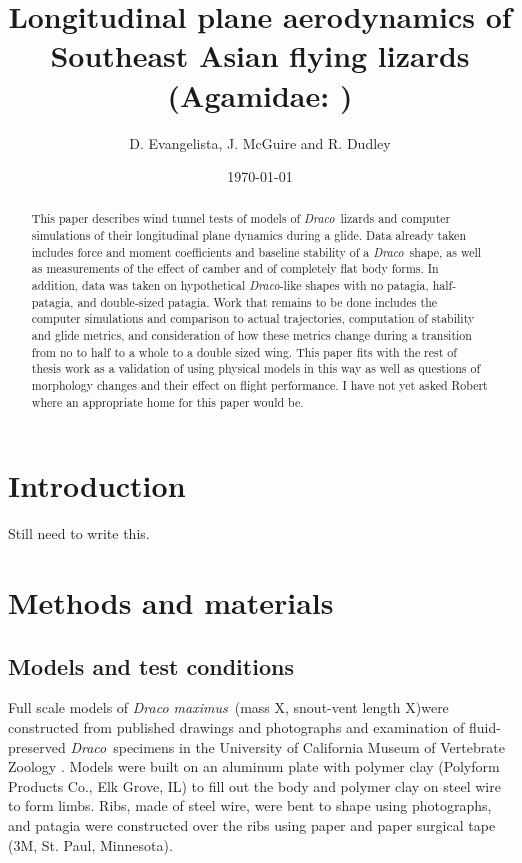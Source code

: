 \documentclass[10pt]{article}
\title{Longitudinal plane aerodynamics of Southeast Asian flying lizards (Agamidae: \Draco)}
\author{D. Evangelista, J. McGuire and R. Dudley}
\date{\today}
\newcommand{\Draco}{\emph{Draco}}
\newcommand{\Dracomaximus}{\emph{Draco maximus}}
\begin{document}
\maketitle
\begin{abstract}
This paper describes wind tunnel tests of models of \Draco\ lizards and computer simulations of their longitudinal plane dynamics during a glide.  Data already taken includes force and moment coefficients and baseline stability of a \Draco\ shape, as well as measurements of the effect of camber and of  completely flat body forms.  In addition, data was taken on hypothetical \Draco-like shapes with no patagia, half-patagia, and double-sized patagia.  Work that remains to be done includes the computer simulations and comparison to actual trajectories, computation of stability and glide metrics, and consideration of how these metrics change during a transition from no to half to a whole to a double sized wing. This paper fits with the rest of thesis work as a validation of using physical models in this way as well as questions of morphology changes and their effect on flight performance. I have not yet asked Robert where an appropriate home for this paper would be. 
\end{abstract}

\section{Introduction}
Still need to write this. 

\section{Methods and materials}
\subsection{Models and test conditions}
Full scale models of \Dracomaximus\ (mass X, snout-vent length X)were constructed from published drawings and photographs and examination of fluid-preserved \Draco\ specimens in the University of California Museum of Vertebrate Zoology \citep{McGuire:2003, McGuire:2005, Savile:1962, Hairston:1957}.  Models were built on an aluminum plate with polymer clay (Polyform Products Co., Elk Grove, IL) to fill out the body and polymer clay on steel wire to form limbs.  Ribs, made of steel wire, were bent to shape using photographs, and patagia were constructed over the ribs using paper and paper surgical tape (3M, St. Paul, Minnesota).
\end{document}
